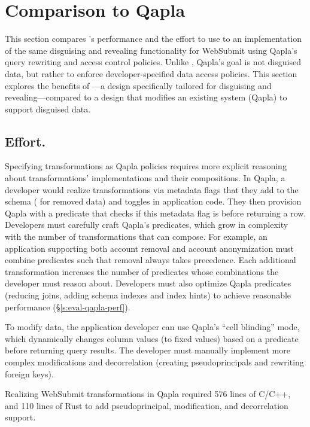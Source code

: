 \section{Comparison to Qapla}
\label{s:eval-qapla}

This section compares \sys's performance and the effort to use \sys to an
implementation of the same disguising and revealing functionality for WebSubmit
using Qapla’s query rewriting and access control policies. 
%
Unlike \sys, Qapla's goal is not disguised data, but rather to enforce
developer-specified data access policies.
%
This section explores the benefits of \sys---a design specifically tailored for
disguising and revealing---compared to a design that modifies an existing system
(\ie Qapla) to support disguised data.
%

%
\subsection{Effort.}
%
Specifying \xxing transformations as Qapla policies requires more
explicit reasoning about transformations' implementations and their
compositions.
%
In Qapla, a developer would realize \xxing transformations via metadata flags
that they add to the schema (\eg {} for removed data) and toggles in
application code. They then provision Qapla with a predicate that checks if
this metadata flag is  before returning a row.
%
Developers must carefully craft Qapla's predicates, which grow in complexity
with the number of \xxing transformations that can compose. For example, an
application supporting both account removal and account anonymization must
combine predicates such that removal always takes precedence. Each additional
transformation increases the number of predicates whose combinations the
developer must reason about.
%
Developers must also optimize Qapla predicates (\eg reducing joins, adding
schema indexes and index hints) to achieve reasonable performance
(\S\ref{s:eval-qapla-perf}).

%
To modify data, the application developer can use Qapla's ``cell blinding''
mode, which dynamically changes column values (to fixed values) based on a
predicate before returning query results.
%
The developer must manually implement more complex modifications and
decorrelation (\ie creating pseudoprincipals and rewriting foreign keys).
%

%
Realizing WebSubmit transformations in Qapla required 576 lines of C/C++, and
110 lines of Rust to add pseudoprincipal, modification, and decorrelation
support.
%

